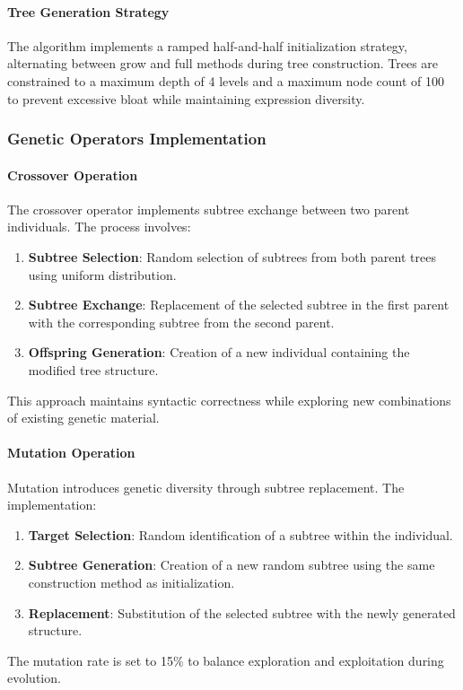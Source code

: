 \documentclass[a4paper,12pt]{article}
\begin{document}
\paragraph{Tree Generation Strategy}
The algorithm implements a ramped half-and-half initialization strategy, alternating between grow and full methods during tree construction. Trees are constrained to a maximum depth of 4 levels and a maximum node count of 100 to prevent excessive bloat while maintaining expression diversity.

\subsubsection{Genetic Operators Implementation}
\paragraph{Crossover Operation}
The crossover operator implements subtree exchange between two parent individuals. The process involves:
\begin{enumerate}
    \item \textbf{Subtree Selection}: Random selection of subtrees from both parent trees using uniform distribution.
    \item \textbf{Subtree Exchange}: Replacement of the selected subtree in the first parent with the corresponding subtree from the second parent.
    \item \textbf{Offspring Generation}: Creation of a new individual containing the modified tree structure.
\end{enumerate}
This approach maintains syntactic correctness while exploring new combinations of existing genetic material.

\paragraph{Mutation Operation}
Mutation introduces genetic diversity through subtree replacement. The implementation:
\begin{enumerate}
    \item \textbf{Target Selection}: Random identification of a subtree within the individual.
    \item \textbf{Subtree Generation}: Creation of a new random subtree using the same construction method as initialization.
    \item \textbf{Replacement}: Substitution of the selected subtree with the newly generated structure.
\end{enumerate}
The mutation rate is set to 15\% to balance exploration and exploitation during evolution.
\end{document}
